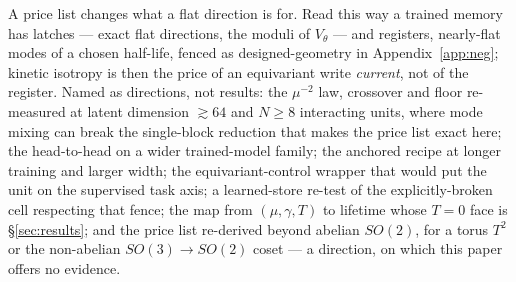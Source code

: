 \documentclass{article}
\begin{document}
A price list changes what a flat direction is for. Read this way a trained memory has latches --- exact flat directions, the moduli of $V_\theta$ --- and registers, nearly-flat modes of a chosen half-life, fenced as designed-geometry in Appendix~\ref{app:neg}; kinetic isotropy is then the price of an equivariant write \emph{current}, not of the register. Named as directions, not results: the $\mu^{-2}$ law, crossover and floor re-measured at latent dimension $\gtrsim64$ and $N\ge8$ interacting units, where mode mixing can break the single-block reduction that makes the price list exact here; the head-to-head on a wider trained-model family; the anchored recipe at longer training and larger width; the equivariant-control wrapper that would put the unit on the supervised task axis; a learned-store re-test of the explicitly-broken cell respecting that fence; the map from $(\mu,\gamma,T)$ to lifetime whose $T=0$ face is \S\ref{sec:results}; and the price list re-derived beyond abelian $SO(2)$, for a torus $T^2$ or the non-abelian $SO(3)\to SO(2)$ coset --- a direction, on which this paper offers no evidence.
\end{document}
